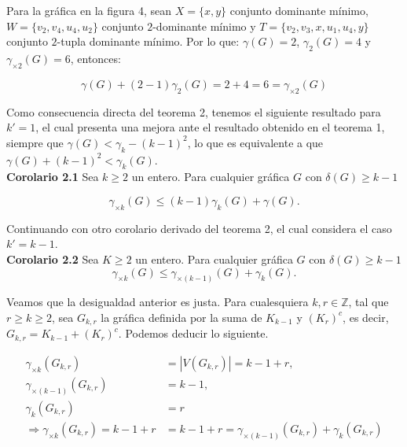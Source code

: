 \documentclass{article}
\begin{document}

Para la gráfica en la figura 4, sean $X=\{x,y\}$ conjunto dominante mínimo, $W=\{v_2, v_4, u_4, u_2\}$ conjunto $2$-dominante mínimo y $T=\{v_2, v_3, x, u_1, u_4, y\}$ conjunto $2$-tupla dominante mínimo. Por lo que: $\gamma(G)=2$, $\gamma_{2}(G)=4$ y $\gamma_{\times 2}(G)=6$, entonces:
	
	
	$$\gamma(G) + (2-1)\gamma_{2}(G) = 2+4 = 6 = \gamma_{\times 2}(G)$$
	

Como consecuencia directa del teorema 2, tenemos el siguiente resultado para $k'=1$, el cual presenta una mejora ante el resultado obtenido en el teorema 1, siempre que $\gamma(G)<\gamma_{k}-(k-1)^2$, lo que es equivalente a que $\gamma(G)+(k-1)^2<\gamma_{k}(G)$.\\

\textbf{Corolario 2.1} Sea $k\geq 2$ un entero. Para cualquier gráfica $G$ con $\delta(G)\ge k-1$

$$\gamma_{\times k}(G) \leq (k-1)\gamma_{k}(G) + \gamma(G).$$

Continuando con otro corolario derivado del teorema 2, el cual considera el caso $k'=k-1$.\\
	
\textbf{Corolario 2.2} Sea $K \geq 2$ un entero. Para cualquier gráfica $G$ con $\delta(G) \geq k-1$ \\

$$\gamma_{\times k}(G) \leq \gamma_{\times (k-1)}(G)+\gamma_{k}(G).$$ 
	
	

	
Veamos que la desigualdad anterior es justa. Para cualesquiera $k,r \in \mathbb{Z}$, tal que $r\geq k \geq 2$, sea $G_{k,r}$ la gráfica definida por la suma de $K_{k-1}$ y $(K_{r})^{c}$, es decir, $G_{k,r}=K_{k-1}+(K_{r})^{c}$. Podemos deducir lo siguiente.

\begin{align*}
\gamma_{\times k}(G_{k,r}) & = |V(G_{k,r})|=k-1+r,\\
\gamma_{\times (k-1)}(G_{k,r}) & =k-1,\\
\gamma_{k}(G_{k,r}) & =r\\
\Longrightarrow \gamma_{\times k}(G_{k,r})= k-1+r & = k-1+r = \gamma_{\times (k-1)}(G_{k,r})+\gamma_k(G_{k,r})
\end{align*}
\end{document}
